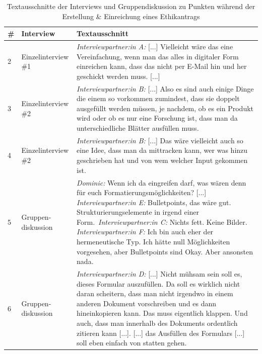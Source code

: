 \documentclass[a4paper,12pt,twoside,numbers=noendperiod]{scrreprt}
\begin{document}
\begin{table}[ht!]
    \centering
    \begin{tabular}{p{.05\linewidth} | p{.2\linewidth} | p{.65\linewidth}}
        \# & \textbf{Interview} & \textbf{Textausschnitt}\\
        \hline
        2 & Einzelinterview \#1 & \textit{Interviewpartner:in A:} [...] Vielleicht wäre das eine Vereinfachung, wenn man das alles in digitaler Form einreichen kann, dass das nicht per E-Mail hin und her geschickt werden muss. [...] \\
        \hline
        3 & Einzelinterview \#2 & \textit{Interviewpartner:in B:} [...] Also es sind auch einige Dinge die einem so vorkommen zumindest, dass sie doppelt ausgefüllt werden müssen, je nachdem, ob es ein Produkt wird oder ob es nur eine Forschung ist, dass man da unterschiedliche Blätter ausfüllen muss. \\
        \hline
        4 & Einzelinterview \#2 & \textit{Interviewpartner:in B:} [...]  Das wäre vielleicht auch so eine Idee, dass man da mittracken kann, wer was hinzu geschrieben hat und von wem welcher Input gekommen ist. \\
        \hline
        5 & Gruppen-diskussion & \textit{Dominic:} Wenn ich da eingreifen darf, was wären denn für euch Formatierungsmöglichkeiten? [...]\newline
        \textit{Interviewpartner:in E:} Bulletpoints, das wäre gut. Strukturierungselemente in irgend einer Form.\newline\
        \textit{Interviewpartner:in C:} Nichts fett. Keine Bilder.\newline
        \textit{Interviewpartner:in F:} Ich bin auch eher der hermeneutische Typ. Ich hätte null Möglichkeiten vorgesehen, aber Bulletpoints sind Okay. Aber ansonsten nada. \\
        \hline
        6 & Gruppen-diskussion & \textit{Interviewpartner:in D:} [...] Nicht mühsam sein soll es, dieses Formular auszufüllen. Da soll es wirklich nicht daran scheitern, dass man nicht irgendwo in einem anderen Dokument vorschreiben und es dann hineinkopieren kann. Das muss eigentlich klappen. Und auch, dass man innerhalb des Dokuments ordentlich zitieren kann [...]. [...] das Ausfüllen des Formulars [...] soll eben einfach von statten gehen. \\
    \end{tabular}
    \caption{Textausschnitte der Interviews und Gruppendiskussion zu Punkten während der Erstellung \& Einreichung eines Ethikantrags}
    \label{tab:anforderungen-während-erstellung-einreichung}
\end{table}
\end{document}
